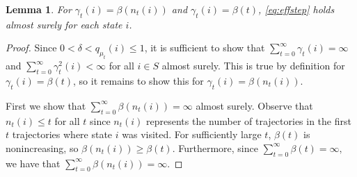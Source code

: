 \documentclass[12pt]{article}
\newtheorem{lemma}{Lemma}
\begin{document}
\begin{lemma}\label{lem_step_size}
For $\gamma_t(i) = \beta(n_t(i))$ and $\gamma_t(i) = \beta(t)$, \eqref{eq:effstep} holds almost surely for each state $i$.
\end{lemma}
\begin{proof} Since $0 < \delta < q_{\mu_t}(i) \leq 1$, it is sufficient to show that $\sum_{t=0}^\infty \gamma_t(i) = \infty$ and $\sum_{t=0}^\infty \gamma^2_t(i) < \infty$ for all $i \in S$ almost surely. This is true by definition for $\gamma_t(i) = \beta(t)$, so it remains to show this for $\gamma_t(i) =\beta(n_t(i))$. 

First we show that $\sum_{t=0}^\infty \beta(n_t(i))=\infty$ almost surely. Observe that $n_t(i) \leq t $ for all $t$ since $n_t(i)$ represents the number of trajectories in the first $t$ trajectories where state $i$ was visited. For sufficiently large $t$, $\beta(t)$ is nonincreasing, so $\beta(n_t(i)) \geq \beta(t)$. Furthermore, since $\sum_{t=0}^\infty \beta(t) =\infty,$ we have that $\sum_{t=0}^\infty \beta(n_t(i)) = \infty.$

\begin{comment}
We now show that $\sum_{t=0}^\infty \beta^2(n_t(i))<\infty.$ Recall that

\begin{align*}
n_t(i) = 1 + \sum_{\tau < t} \I_{i \in X_k^{\mu_\tau}} \leq t+1,
\end{align*}
so
\begin{align*}
\sum_{t=0}^\infty {\gamma_t(i)} = \sum_{t=0}^\infty \frac{1}{n_t(i)} \geq  \sum_{t=0}^\infty \frac{1}{t+1} = \infty.
\end{align*}
\end{comment}


\end{proof}
\end{document}
